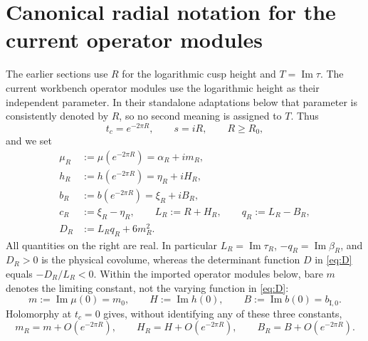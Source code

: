 
\section{Canonical radial notation for the current operator modules}
\label{cusp-spec-section}

The earlier sections use \(R\) for the logarithmic cusp height and
\(T=\operatorname{Im}\tau\).  The current workbench operator modules use the
logarithmic height as their independent parameter.  In their standalone
adaptations below that parameter is consistently denoted by \(R\), so no
second meaning is assigned to \(T\).  Thus
\begin{equation}
 t_c=e^{-2\pi R},\qquad s=iR,\qquad R\ge R_0,
 \label{eq:current-radial-ray}
\end{equation}
and we set
\begin{equation}
 \begin{aligned}
  \mu_R&:=\mu(e^{-2\pi R})=\alpha_R+i m_R,\\
  h_R&:=h(e^{-2\pi R})=\eta_R+i H_R,\\
  b_R&:=b(e^{-2\pi R})=\xi_R+i B_R,\\
  c_R&:=\xi_R-\eta_R,\qquad
  L_R:=R+H_R,\qquad q_R:=L_R-B_R,\\
  D_R&:=L_Rq_R+6m_R^2.
 \end{aligned}
 \label{cusp-spec-radial-notation}
\end{equation}
All quantities on the right are real.  In particular
\(L_R=\operatorname{Im}\tau_R\),
\(-q_R=\operatorname{Im}\beta_R\), and \(D_R>0\) is the physical covolume,
whereas the determinant function \(D\) in \eqref{eq:D} equals
\(-D_R/L_R<0\).  Within the imported operator modules below, bare \(m\)
denotes the limiting constant, not the varying function in
\eqref{eq:D}:
\begin{equation}
 m:=\operatorname{Im}\mu(0)=m_0,\qquad
 H:=\operatorname{Im}h(0),\qquad
 B:=\operatorname{Im}b(0)=b_{\mathrm I,0}.
 \label{cusp-spec-limiting-imaginary-parts}
\end{equation}
Holomorphy at \(t_c=0\) gives, without identifying any of these three
constants,
\begin{equation}
 m_R=m+O(e^{-2\pi R}),\qquad
 H_R=H+O(e^{-2\pi R}),\qquad
 B_R=B+O(e^{-2\pi R}).
 \label{eq:current-radial-errors}
\end{equation}

